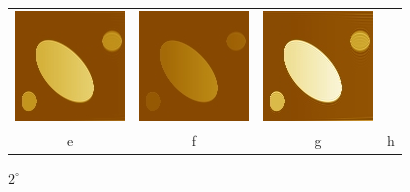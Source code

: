 \documentclass{procDDs}
\begin{document}
\begin{figure}[h!]
\begin{tabular}{cccc}
		\includegraphics[width=0.2\linewidth]{img/6/6.jpg}&
		\includegraphics[width=0.2\linewidth]{img/6/9.jpg}&
		\includegraphics[width=0.2\linewidth]{img/6/5.jpg}\\
		e & f & g & h \\
	\end{tabular}
	\caption{$2^\circ$}
\end{figure}
\end{document}
